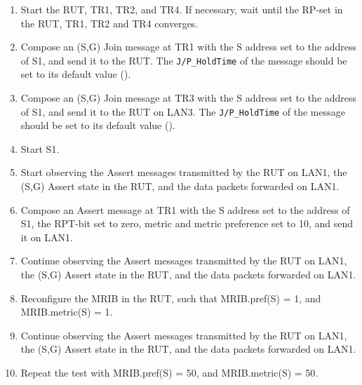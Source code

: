 \documentclass[11pt]{report}
\begin{document}

\begin{enumerate}

  \item Start the RUT, TR1, TR2, and TR4. If necessary, wait until the RP-set
  in the RUT, TR1, TR2 and TR4 converges.

  \item Compose an (S,G) Join message at TR1 with the S address set to the
  address of S1, and send it to the RUT.
  The \verb=J/P_HoldTime= of the message should be set to its default
  value ({\PimsmJPHoldTime}).

  \item Compose an (S,G) Join message at TR3 with the S address set to the
  address of S1, and send it to the RUT on LAN3.
  The \verb=J/P_HoldTime= of the message should be set to its default
  value ({\PimsmJPHoldTime}).

  \item Start S1.

  \item Start observing the Assert messages transmitted by the RUT on
  LAN1, the (S,G) Assert state in the RUT, and the data packets forwarded on
  LAN1.

  \item Compose an Assert message at TR1 with the S address set to the
  address of S1, the RPT-bit set to zero, metric and metric preference set to
  10, and send it on LAN1.

  \item Continue observing the Assert messages transmitted by the RUT on
  LAN1, the (S,G) Assert state in the RUT, and the data packets forwarded on
  LAN1.

  \item Reconfigure the MRIB in the RUT, such that MRIB.pref(S) = 1, and
  MRIB.metric(S) = 1.

  \item Continue observing the Assert messages transmitted by the RUT on
  LAN1, the (S,G) Assert state in the RUT, and the data packets forwarded on
  LAN1.

  \item Repeat the test with MRIB.pref(S) = 50, and MRIB.metric(S) = 50.

\end{enumerate}

\end{document}
